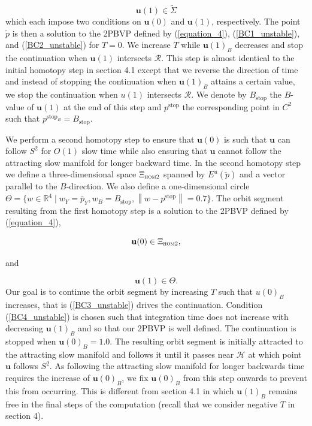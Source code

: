 \documentclass{ws-ijbc}
\begin{document}
\begin{equation}
\mathbf{u}(1) \in \tilde{\Sigma}
\label{BC2_unstable}
\end{equation}
\noindent
which each impose two conditions on $\mathbf{u}(0)$ and $\mathbf{u}(1)$, respectively.  The point $\tilde{p}$ is then a solution to the 2PBVP defined by (\ref{equation_4}), (\ref{BC1_unstable}), and (\ref{BC2_unstable}) for $T=0$.  We increase $T$ while $\mathbf{u}(1)_B$ decreases and stop the continuation when $\mathbf{u}(1)$ intersects $\mathscr{R}$.  This step is almost identical to the initial homotopy step in section 4.1 except that we reverse the direction of time and instead of stopping the continuation when $\mathbf{u}(1)_B$ attains a certain value, we stop the continuation when $u(1)$ intersects $\mathscr{R}$.  We denote by $B_{\mathrm{stop}}$ the $B$-value of $\mathbf{u}(1)$ at the end of this step and $p^{\text{stop}}$ the corresponding point in $C^2$ such that $p^{\text{stop}_B}=B_{\text{stop}}$.

We perform a second homotopy step to ensure that $\mathbf{u}(0)$ is such that $\mathbf{u}$ can follow $S^2$ for $O(1)$ slow time while also ensuring that $\mathbf{u}$ cannot follow the attracting slow manifold for longer backward time.  In the second homotopy step we define a three-dimensional space $\Xi_{\textsc{hom2}}$ spanned by $E^u(\tilde{p})$ and a vector parallel to the $B$-direction.  We also define a one-dimensional circle $\Theta = \{ w \in \mathbb{R}^4 \; | \; w_Y=\bar{p}_Y, w_B=B_{\mathrm{stop}}, \left\lVert w-p^{\mathrm{stop}} \right\lVert=0.7\}$.  The orbit segment resulting from the first homotopy step is a solution to the 2PBVP defined by (\ref{equation_4}),

\begin{equation}
\mathbf{u}(0) \in \Xi_{\textsc{hom2}},
\label{BC3_unstable}
\end{equation}

\noindent
and 

\begin{equation}
\mathbf{u}(1) \in \Theta.
\label{BC4_unstable}
\end{equation}
\noindent
Our goal is to continue the orbit segment by increasing $T$ such that $u(0)_B$ increases, that is (\ref{BC3_unstable}) drives the continuation.  Condition (\ref{BC4_unstable}) is chosen such that integration time does not increase with decreasing $\mathbf{u}(1)_B$ and so that our 2PBVP is well defined.  The continuation is stopped when $\mathbf{u}(0)_B =1.0$.  The resulting orbit segment is initially attracted to the attracting slow manifold and follows it until it passes near $\mathscr{H}$ at which point $\mathbf{u}$ follows $S^2$.  As following the attracting slow manifold for longer backwards time requires the increase of $\mathbf{u}(0)_B$, we fix $\mathbf{u}(0)_B$ from this step onwards to prevent this from occurring.  This is different from section 4.1 in which $\mathbf{u}(1)_B$ remains free in the final steps of the computation (recall that we consider negative $T$ in section 4).
\end{document}
